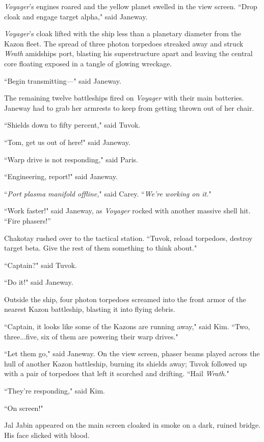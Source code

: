 \documentclass[twoside,letterpaper,12pt]{memoir}
\begin{document}
\textit{Voyager}'s engines roared and the yellow planet swelled in the view screen. ``Drop cloak and engage target alpha," said Janeway. 

\textit{Voyager}'s cloak lifted with the ship less than a planetary diameter from the Kazon fleet. The spread of three photon torpedoes streaked away and struck \textit{Wrath }amidships port, blasting his superstructure apart and leaving the central core floating exposed in a tangle of glowing wreckage. 

``Begin transmitting---" said Janeway. 

The remaining twelve battleships fired on \textit{Voyager} with their main batteries. Janeway had to grab her armrests to keep from getting thrown out of her chair. 

``Shields down to fifty percent," said Tuvok. 

``Tom, get us out of here!" said Janeway. 

``Warp drive is not responding," said Paris. 

``Engineering, report!" said Janeway. 

``\textit{Port plasma manifold offline,}" said Carey. ``\textit{We're working on it.}" 

``Work faster!" said Janeway, as \textit{Voyager} rocked with another massive shell hit. ``Fire phasers!” 

Chakotay rushed over to the tactical station. ``Tuvok, reload torpedoes, destroy target beta. Give the rest of them something to think about." 

``Captain?" said Tuvok. 

``Do it!" said Janeway. 

Outside the ship, four photon torpedoes screamed into the front armor of the nearest Kazon battleship, blasting it into flying debris. 

``Captain, it looks like some of the Kazons are running away," said Kim. ``Two, three...five, six of them are powering their warp drives." 

``Let them go," said Janeway. On the view screen, phaser beams played across the hull of another Kazon battleship, burning its shields away; Tuvok followed up with a pair of torpedoes that left it scorched and drifting. ``Hail \textit{Wrath}." 

``They're responding," said Kim. 

``On screen!" 

Jal Jabin appeared on the main screen cloaked in smoke on a dark, ruined bridge. His face slicked with blood. 
\end{document}
